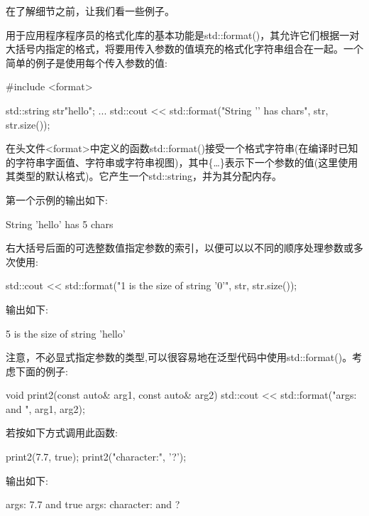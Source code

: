 
在了解细节之前，让我们看一些例子。


用于应用程序程序员的格式化库的基本功能是std::format()，其允许它们根据一对大括号内指定的格式，将要用传入参数的值填充的格式化字符串组合在一起。一个简单的例子是使用每个传入参数的值:

\begin{cpp}
#include <format>

std::string str{"hello"};
...
std::cout << std::format("String '{}' has {} chars\n", str, str.size());
\end{cpp}

在头文件<format>中定义的函数std::format()接受一个格式字符串(在编译时已知的字符串字面值、字符串或字符串视图)，其中\{…\}表示下一个参数的值(这里使用其类型的默认格式)。它产生一个std::string，并为其分配内存。

第一个示例的输出如下:

\begin{shell}
String ’hello’ has 5 chars
\end{shell}

右大括号后面的可选整数值指定参数的索引，以便可以以不同的顺序处理参数或多次使用:

\begin{cpp}
std::cout << std::format("{1} is the size of string '{0}'\n", str, str.size());
\end{cpp}

输出如下:

\begin{shell}
5 is the size of string ’hello’
\end{shell}

注意，不必显式指定参数的类型,可以很容易地在泛型代码中使用std::format()。考虑下面的例子:

\begin{cpp}
void print2(const auto& arg1, const auto& arg2)
{
	std::cout << std::format("args: {} and {}\n", arg1, arg2);
}
\end{cpp}

若按如下方式调用此函数:

\begin{cpp}
print2(7.7, true);
print2("character:", '?');
\end{cpp}

输出如下:

\begin{shell}
args: 7.7 and true
args: character: and ?
\end{shell}


